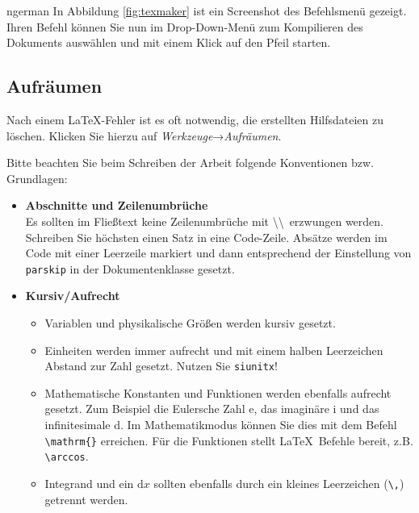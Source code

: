\begin{foreignlanguage}{ngerman}
In Abbildung \ref{fig:texmaker} ist ein Screenshot des Befehlsmenü gezeigt. Ihren Befehl können Sie nun im Drop-Down-Menü zum 
Kompilieren des Dokuments auswählen und mit einem Klick auf den Pfeil starten.

\subsection{Aufräumen}

Nach einem \LaTeX-Fehler ist es oft notwendig, die erstellten Hilfsdateien zu löschen.
Klicken Sie hierzu auf \emph{Werkzeuge}→\emph{Aufräumen}.



Bitte beachten Sie beim Schreiben der Arbeit folgende Konventionen bzw. Grundlagen:

\begin{itemize}
    \item \textbf{Abschnitte und Zeilenumbrüche} \\
        Es sollten im Fließtext keine Zeilenumbrüche mit \textbackslash\textbackslash \ erzwungen werden.
        Schreiben Sie höchsten einen Satz in eine Code-Zeile.
        Absätze werden im Code mit einer Leerzeile markiert und dann entsprechend der Einstellung von \texttt{parskip} in der Dokumentenklasse gesetzt.
    \item \textbf{Kursiv/Aufrecht} \\
        \begin{itemize}
            \item Variablen und physikalische Größen werden kursiv gesetzt. 
            \item Einheiten werden immer aufrecht und mit einem halben Leerzeichen Abstand zur Zahl gesetzt. Nutzen Sie \texttt{siunitx}!
            \item Mathematische Konstanten und Funktionen werden ebenfalls aufrecht gesetzt. Zum Beispiel die Eulersche Zahl e, das imaginäre i und das infinitesimale d.
                Im Mathematikmodus können Sie dies mit dem Befehl \verb_\mathrm{}_ erreichen. Für die Funktionen stellt \LaTeX \ Befehle bereit, z.B. \verb+\arccos+.
            \item Integrand und ein $\mathrm{d}x$ sollten ebenfalls durch ein kleines Leerzeichen (\verb+\,+) getrennt werden.
        \end{itemize}
        


\end{itemize}


\end{foreignlanguage}
